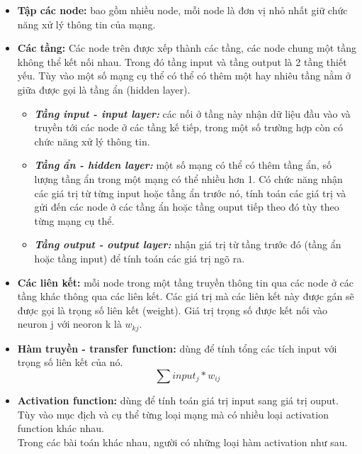 	\begin{itemize}
		\item \textbf{Tập các node:} bao gồm nhiều node, mỗi node là đơn vị nhỏ nhất giữ chức năng xử lý thông tin của mạng.
		\item \textbf{Các tầng:} Các node trên được xếp thành các tầng, các node chung một tầng không thể kết nối nhau. Trong đó tầng input và tầng output là 2 tầng thiết yếu. Tùy vào một số mạng cụ thể có thể có thêm một hay nhiêu tầng nằm ở giữa được gọi là tầng ẩn (hidden layer).
		\begin{itemize}
			\item \textbf{\textit{Tầng input - input layer: }}các nối ở tầng này nhận dữ liệu đầu vào và truyền tới các node ở các tầng kế tiếp, trong một số trường hợp còn có chức năng xử lý thông tin.
			\item \textbf{\textit{Tầng ẩn - hidden layer: }}một số mạng có thể có thêm tầng ẩn, số lượng tầng ẩn trong một mạng có thể nhiều hơn 1. Có chức năng nhận các giá trị từ từng input hoặc tầng ẩn trước nó, tính toán các giá trị và gửi đến các node ở các tầng ẩn hoặc tầng ouput tiếp theo đó tùy theo từng mạng cụ thể.
			\item \textbf{\textit{Tầng output - output layer: }}nhận giá trị từ tầng trước đó (tầng ẩn hoặc tầng input) để tính toán các giá trị ngõ ra.
		\end{itemize}
		\item \textbf{Các liên kết:} mỗi node trong một tầng truyền thông tin qua các node ở các tầng khác thông qua các liên kết. Các giá trị mà các liên kết này được gán sẽ được gọi là trọng số liên kết (weight). Giá trị trọng số được kết nối vào neuron j với neoron k là \(w_{kj}\).
		\item \textbf{Hàm truyền - transfer function: }dùng để tính tổng các tích input với trọng số liên kết của nó. \[ \sum input_j*w_{ij}\]
		
		\item \textbf{Activation function: }dùng để tính toán giá trị input sang giá trị ouput. Tùy vào mục địch và cụ thể từng loại mạng mà có nhiều loại activation function khác nhau.\\
		Trong các bài toán khác nhau, người có những loại hàm activation như sau.
		

\end{itemize}
